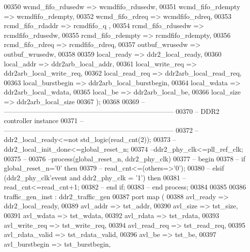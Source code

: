 \begin{DoxyCode}
00350         wcmd_fifo_rdusedw   => wcmdfifo_rdusedw,
00351         wcmd_fifo_rdempty   => wcmdfifo_rdempty,
00352         wcmd_fifo_rdreq => wcmdfifo_rdreq,
00353         rcmd_fifo_rdaddr    => rcmdfifo_q ,
00354         rcmd_fifo_rdusedw   => rcmdfifo_rdusedw,
00355         rcmd_fifo_rdempty   => rcmdfifo_rdempty,
00356         rcmd_fifo_rdreq => rcmdfifo_rdreq,
00357         outbuf_wrusedw      => outbuf_wrusedw, 
00358 
00359         local_ready         => ddr2_local_ready,
00360         local_addr          => ddr2arb_local_addr,
00361         local_write_req => ddr2arb_local_write_req,
00362         local_read_req      => ddr2arb_local_read_req,
00363         local_burstbegin    => ddr2arb_local_burstbegin,
00364         local_wdata         => ddr2arb_local_wdata,
00365         local_be                => ddr2arb_local_be,
00366         local_size          => ddr2arb_local_size
00367         \textcolor{vhdlchar}{)};
00368 
00369 \textcolor{keyword}{-- ---------------------------------------------------------------------------}
00370 \textcolor{keyword}{-- DDR2 controller instance}
00371 \textcolor{keyword}{-- ---------------------------------------------------------------------------}
00372 \textcolor{keyword}{--ddr2\_local\_ready<=not std\_logic(read\_cnt(2));}
00373 \textcolor{keyword}{--ddr2\_local\_init\_done<=global\_reset\_n;}
00374 \textcolor{keyword}{--ddr2\_phy\_clk<=pll\_ref\_clk;}
00375 \textcolor{keyword}{--}
00376 \textcolor{keyword}{--process(global\_reset\_n, ddr2\_phy\_clk)}
00377 \textcolor{keyword}{--    begin}
00378 \textcolor{keyword}{--      if global\_reset\_n='0' then}
00379 \textcolor{keyword}{--        read\_cnt<=(others=>'0'); }
00380 \textcolor{keyword}{--      elsif (ddr2\_phy\_clk'event and ddr2\_phy\_clk = '1') then}
00381 \textcolor{keyword}{--              read\_cnt<=read\_cnt+1;}
00382 \textcolor{keyword}{--      end if;}
00383 \textcolor{keyword}{--    end process;}
00384 
00385 
00386 traffic_gen_inst : ddr2\_traffic\_gen
00387     \textcolor{keywordflow}{port} \textcolor{keywordflow}{map} (
00388         avl\_ready               => ddr2_local_ready,
00389         avl\_addr                    => tst_addr,
00390         avl\_size                    => tst_size,
00391         avl\_wdata               => tst_wdata,
00392         avl\_rdata               => tst_rdata,
00393         avl\_write\_req           => tst_write_req,
00394         avl\_read\_req            => tst_read_req,
00395         avl\_rdata\_valid     => tst_rdata_valid,
00396         avl\_be                  => tst_be,
00397         avl\_burstbegin          => tst_burstbegin,

\end{DoxyCode}
